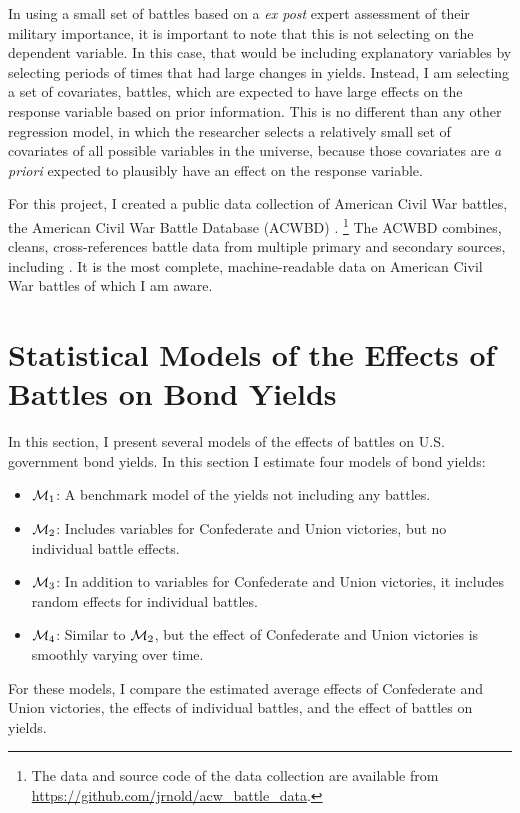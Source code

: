 In using a small set of battles based on a \textit{ex post} expert assessment of their military importance, it is important to note that this is not selecting on the dependent variable.
In this case, that would be including explanatory variables by selecting periods of times that had large changes in yields.
Instead, I am selecting a set of covariates, \ie{}battles, which are expected to have large effects on the response variable based on prior information.
This is no different than any other regression model, in which the researcher selects a relatively small set of covariates of all possible variables in the universe, because those covariates are \textit{a priori} expected to plausibly have an effect on the response variable.

For this project, I created a public data collection of American Civil War battles, the American Civil War Battle Database (ACWBD) \parencite{Arnold2015b}.%
\footnote{The data and source code of the data collection are available from \url{https://github.com/jrnold/acw_battle_data}.}
The ACWBD combines, cleans, cross-references battle data from multiple primary and secondary sources, including \textcites{Phisterer1883}{Livermore1900}{Bodart1908}{dyer1908_war_rebel}{KennedyConservation1998}{CWSAC1993}{cwsac2012}.
It is the most complete, machine-readable data on American Civil War battles of which I am aware.



\section{Statistical Models of the Effects of Battles on Bond Yields}
\label{sec:model-war-events}

In this section, I present several models of the effects of battles on U.S. government bond yields.
In this section I estimate four models of bond yields:
\begin{itemize}
\item $\mathcal{M}_{\text{1}}$: A benchmark model of the yields not including any battles.
\item $\mathcal{M}_{\text{2}}$: Includes variables for Confederate and Union victories, but no individual battle effects.
\item $\mathcal{M}_{\text{3}}$: In addition to variables for Confederate and Union victories, it includes random effects for individual battles.
\item $\mathcal{M}_{\text{4}}$: Similar to $\mathcal{M}_{\text{2}}$, but the effect of Confederate and Union victories is smoothly varying over time.
\end{itemize}
For these models, I compare the estimated average effects of Confederate and Union victories, the effects of individual battles, and the effect of battles on yields.

